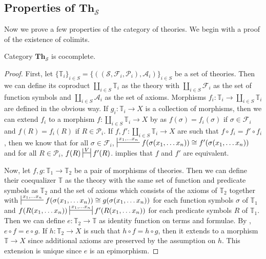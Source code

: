 \documentclass[reqno]{amsart}
\theoremstyle{definition}
\theoremstyle{remark}
\newcommand{\cat}[1]{\mathbf{#1}}
\newcommand{\Th}{\cat{Th}}
\numberwithin{figure}{section}
\begin{document}
\subsection{Properties of $\Th_\mathcal{S}$}

Now we prove a few properties of the category of theories.
We begin with a proof of the existence of colimits.

\begin{prop}
Category $\Th_\mathcal{S}$ is cocomplete.
\end{prop}
\begin{proof}
First, let $\{ \mathbb{T}_i \}_{i \in S} = \{ ((\mathcal{S},\mathcal{F}_i,\mathcal{P}_i),\mathcal{A}_i) \}_{i \in S}$ be a set of theories.
Then we can define its coproduct $\coprod\limits_{i \in S} \mathbb{T}_i$ as the theory with $\coprod\limits_{i \in S} \mathcal{F}_i$ as the set of function symbols and $\coprod\limits_{i \in S} \mathcal{A}_i$ as the set of axioms.
Morphisms $f_i : \mathbb{T}_i \to \coprod\limits_{i \in S} \mathbb{T}_i$ are defined in the obvious way.
If $g_i : \mathbb{T}_i \to X$ is a collection of morphisms, then we can extend $f_i$ to a morphism $f : \coprod\limits_{i \in S} \mathbb{T}_i \to X$
by  as $f(\sigma) = f_i(\sigma)$ if $\sigma \in \mathcal{F}_i$ and $f(R) = f_i(R)$ if $R \in \mathcal{P}_i$.
If $f,f' : \coprod\limits_{i \in S} \mathbb{T}_i \to X$ are such that $f \circ f_i = f' \circ f_i$, then we know that for all
$\sigma \in \mathcal{F}_i$, $\sststile{}{x_1, \ldots x_n} f(\sigma(x_1, \ldots x_n)) \cong f'(\sigma(x_1, \ldots x_n))$ and for all $R \in \mathcal{P}_i$, $f(R) \ssststile{}{V} f'(R)$.
 implies that $f$ and $f'$ are equivalent.

Now, let $f,g : \mathbb{T}_1 \to \mathbb{T}_2$ be a pair of morphisms of theories.
Then we can define their coequalizer $\mathbb{T}$ as the theory with the same set of function and predicate symbols as $\mathbb{T}_2$ and the set of axioms which consists of the axioms of $\mathbb{T}_2$
together with $\sststile{}{x_1, \ldots x_n} f(\sigma(x_1, \ldots x_n)) \cong g(\sigma(x_1, \ldots x_n))$ for each function symbols $\sigma$ of $\mathbb{T}_1$
and $f(R(x_1, \ldots x_n)) \ssststile{}{x_1, \ldots x_n} f'(R(x_1, \ldots x_n))$ for each predicate symbols $R$ of $\mathbb{T}_1$.
Then we can define $e : \mathbb{T}_2 \to \mathbb{T}$ as identity function on terms and formulae.
By , $e \circ f = e \circ g$.
If $h : \mathbb{T}_2 \to X$ is such that $h \circ f = h \circ g$, then it extends to a morphism $\mathbb{T} \to X$ since additional axioms are preserved by the assumption on $h$.
This extension is unique since $e$ is an epimorphism.
\end{proof}
\end{document}
